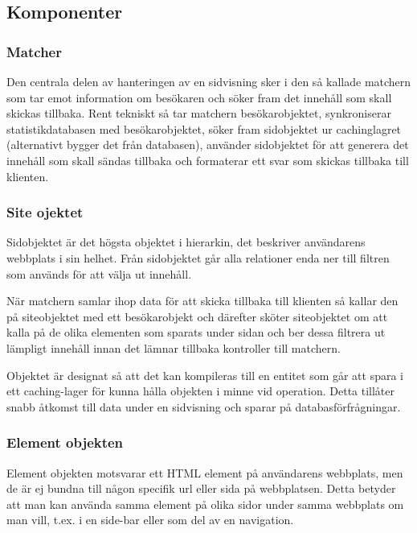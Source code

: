 \subsection{Komponenter}

\subsubsection{Matcher}

Den centrala delen av hanteringen av en sidvisning sker i den så kallade matchern som tar emot information om besökaren och söker fram det innehåll som skall skickas tillbaka. Rent tekniskt så tar matchern besökarobjektet, synkroniserar statistikdatabasen med besökarobjektet, söker fram sidobjektet ur cachinglagret (alternativt bygger det från databasen), använder sidobjektet för att generera det innehåll som skall sändas tillbaka och formaterar ett svar som skickas tillbaka till klienten.

\subsubsection{Site ojektet}



Sidobjektet är det högsta objektet i hierarkin, det beskriver användarens webbplats i sin helhet. Från sidobjektet går alla relationer enda ner till filtren som används för att välja ut innehåll.

När matchern samlar ihop data för att skicka tillbaka till klienten så kallar den på siteobjektet med ett besökarobjekt och därefter sköter siteobjektet om att kalla på de olika elementen som sparats under sidan och ber dessa filtrera ut lämpligt innehåll innan det lämnar tillbaka kontroller till matchern.

Objektet är designat så att det kan kompileras till en entitet som går att spara i ett caching-lager för kunna hålla objekten i minne vid operation. Detta tillåter snabb åtkomst till data under en sidvisning och sparar på databasförfrågningar.

\subsubsection{Element objekten}



Element objekten motsvarar ett HTML element på användarens webbplats, men de är ej bundna till någon specifik url eller sida på webbplatsen. Detta betyder att man kan använda samma element på olika sidor under samma webbplats om man vill, t.ex. i en side-bar eller som del av en navigation.

